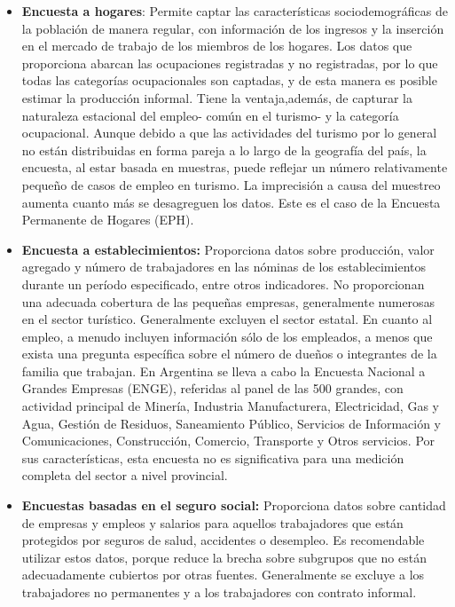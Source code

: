 \documentclass[
  openany]{book}
\begin{document}
\begin{itemize}
\item
  \textbf{Encuesta a hogares}: Permite captar las características sociodemográficas de la población de manera regular, con información de los ingresos y la inserción en el mercado de trabajo de los miembros de los hogares.
  Los datos que proporciona abarcan las ocupaciones registradas y no registradas, por lo que todas las categorías ocupacionales son captadas, y de esta manera es posible estimar la producción informal.
  Tiene la ventaja,además, de capturar la naturaleza estacional del empleo- común en el turismo- y la categoría ocupacional.
  Aunque debido a que las actividades del turismo por lo general no están distribuidas en forma pareja a lo largo de la geografía del país, la encuesta, al estar basada en muestras, puede reflejar un número relativamente pequeño de casos de empleo en turismo.
  La imprecisión a causa del muestreo aumenta cuanto más se desagreguen los datos.
  Este es el caso de la Encuesta Permanente de Hogares (EPH).
\item
  \textbf{Encuesta a establecimientos:} Proporciona datos sobre producción, valor agregado y número de trabajadores en las nóminas de los establecimientos durante un período especificado, entre otros indicadores.
  No proporcionan una adecuada cobertura de las pequeñas empresas, generalmente numerosas en el sector turístico.
  Generalmente excluyen el sector estatal.
  En cuanto al empleo, a menudo incluyen información sólo de los empleados, a menos que exista una pregunta específica sobre el número de dueños o integrantes de la familia que trabajan.
  En Argentina se lleva a cabo la Encuesta Nacional a Grandes Empresas (ENGE), referidas al panel de las 500 grandes, con actividad principal de Minería, Industria Manufacturera, Electricidad, Gas y Agua, Gestión de Residuos, Saneamiento Público, Servicios de Información y Comunicaciones, Construcción, Comercio, Transporte y Otros servicios.
  Por sus características, esta encuesta no es significativa para una medición completa del sector a nivel provincial.
\item
  \textbf{Encuestas basadas en el seguro social:} Proporciona datos sobre cantidad de empresas y empleos y salarios para aquellos trabajadores que están protegidos por seguros de salud, accidentes o desempleo.
  Es recomendable utilizar estos datos, porque reduce la brecha sobre subgrupos que no están adecuadamente cubiertos por otras fuentes.
  Generalmente se excluye a los trabajadores no permanentes y a los trabajadores con contrato informal.

\end{itemize}
\end{document}
